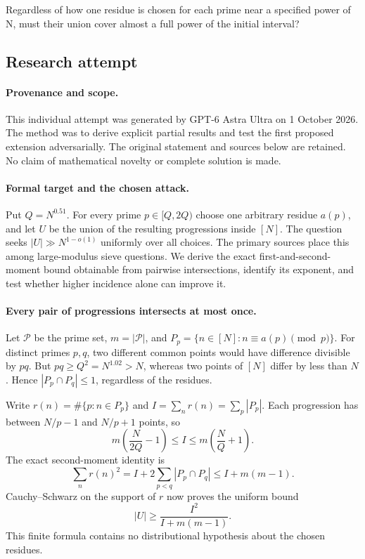 \documentclass[11pt,a4paper]{article}
\begin{document}
Regardless of how one residue is chosen for each prime near a specified power of N, must their union cover almost a full power of the initial interval?

\subsection{Research attempt}

\paragraph{Provenance and scope.}
This individual attempt was generated by GPT-6 Astra Ultra on 1 October 2026. The method was to derive explicit partial results and test the first proposed extension adversarially. The original statement and sources below are retained. No claim of mathematical novelty or complete solution is made.

\paragraph{Formal target and the chosen attack.}
Put $Q=N^{0.51}$. For every prime $p\in[Q,2Q)$ choose one arbitrary residue $a(p)$, and let $U$ be the union of the resulting progressions inside $[N]$. The question seeks $|U|\gg N^{1-o(1)}$ uniformly over all choices. The primary sources place this among large-modulus sieve questions. We derive the exact first-and-second-moment bound obtainable from pairwise intersections, identify its exponent, and test whether higher incidence alone can improve it.

\paragraph{Every pair of progressions intersects at most once.}
Let $\mathcal P$ be the prime set, $m=|\mathcal P|$, and $P_p=\{n\in[N]:n\equiv a(p)\pmod p\}$. For distinct primes $p,q$, two different common points would have difference divisible by $pq$. But $pq\geq Q^2=N^{1.02}>N$, whereas two points of $[N]$ differ by less than $N$. Hence $|P_p\cap P_q|\leq1$, regardless of the residues.

Write $r(n)=\#\{p:n\in P_p\}$ and $I=\sum_nr(n)=\sum_p|P_p|$. Each progression has between $N/p-1$ and $N/p+1$ points, so
\[
 m\left(\frac{N}{2Q}-1\right)\leq I
 \leq m\left(\frac NQ+1\right).
\]
The exact second-moment identity is
\[
 \sum_nr(n)^2=I+2\sum_{p<q}|P_p\cap P_q|
 \leq I+m(m-1).
\]
Cauchy--Schwarz on the support of $r$ now proves the uniform bound
\[
 |U|\geq\frac{I^2}{I+m(m-1)}.
\]
This finite formula contains no distributional hypothesis about the chosen residues.
\end{document}
